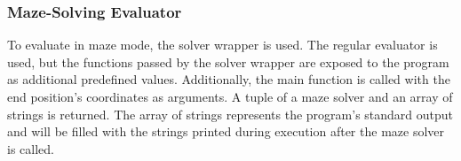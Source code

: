 \subsubsection{Maze-Solving Evaluator}

To evaluate in maze mode, the solver wrapper is used. The regular evaluator is used, but the functions passed by the solver wrapper are exposed to the program as additional predefined values. Additionally, the main function is called with the end position's coordinates as arguments. A tuple of a maze solver and an array of strings is returned. The array of strings represents the program's standard output and will be filled with the strings printed during execution after the maze solver is called.
